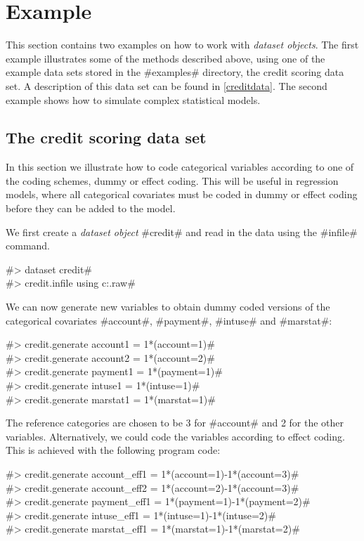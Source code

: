 \section{Example}

This section contains two examples on how to work with {\em
dataset objects}. The first example illustrates some of the
methods described above, using one of the example data sets stored
in the #examples# directory, the credit scoring data set. A
description of this data set can be found in \autoref{creditdata}.
The second example shows how to simulate complex statistical
models.

\subsection{The credit scoring data set}

In this section we illustrate how to code categorical variables
according to one of the coding schemes, dummy or effect coding.
This will be useful in regression models, where all categorical
covariates must be coded in dummy or effect coding before they can
be added to the model.

We first create a {\em dataset object} #credit# and read in the data using the #infile# command.

#> dataset credit# \\
#> credit.infile using c:\bayesx\examples\credit.raw#

We can now generate new variables to obtain dummy coded versions
of the categorical covariates
#account#, #payment#, #intuse# and #marstat#:

#> credit.generate account1  = 1*(account=1)# \\
#> credit.generate account2  = 1*(account=2)# \\
#> credit.generate payment1 = 1*(payment=1)# \\
#> credit.generate intuse1 = 1*(intuse=1)# \\
#> credit.generate marstat1 = 1*(marstat=1)#

The reference categories are chosen to be 3 for #account# and 2
for the other variables. Alternatively, we could code the
variables according to effect coding. This is achieved with the
following program code:

#> credit.generate account_eff1  = 1*(account=1)-1*(account=3)# \\
#> credit.generate account_eff2  = 1*(account=2)-1*(account=3)# \\
#> credit.generate payment_eff1 = 1*(payment=1)-1*(payment=2)# \\
#> credit.generate intuse_eff1 = 1*(intuse=1)-1*(intuse=2)# \\
#> credit.generate marstat_eff1 = 1*(marstat=1)-1*(marstat=2)#


